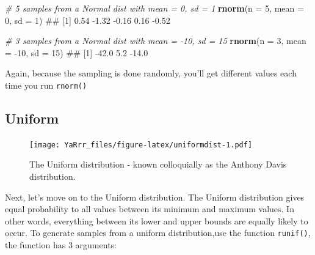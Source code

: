 \documentclass[]{book}
\newenvironment{Shaded}{\begin{snugshade}}{\end{snugshade}}
\newcommand{\KeywordTok}[1]{\textcolor[rgb]{0.13,0.29,0.53}{\textbf{{#1}}}}
\newcommand{\DataTypeTok}[1]{\textcolor[rgb]{0.13,0.29,0.53}{{#1}}}
\newcommand{\DecValTok}[1]{\textcolor[rgb]{0.00,0.00,0.81}{{#1}}}
\newcommand{\CommentTok}[1]{\textcolor[rgb]{0.56,0.35,0.01}{\textit{{#1}}}}
\newcommand{\NormalTok}[1]{{#1}}
\theoremstyle{definition}
\theoremstyle{definition}
\theoremstyle{remark}
\begin{document}
\begin{Shaded}
\begin{Highlighting}[]
\CommentTok{# 5 samples from a Normal dist with mean = 0, sd = 1}
\KeywordTok{rnorm}\NormalTok{(}\DataTypeTok{n =} \DecValTok{5}\NormalTok{, }\DataTypeTok{mean =} \DecValTok{0}\NormalTok{, }\DataTypeTok{sd =} \DecValTok{1}\NormalTok{)}
\NormalTok{## [1]  0.54 -1.32 -0.16  0.16 -0.52}

\CommentTok{# 3 samples from a Normal dist with mean = -10, sd = 15}
\KeywordTok{rnorm}\NormalTok{(}\DataTypeTok{n =} \DecValTok{3}\NormalTok{, }\DataTypeTok{mean =} \NormalTok{-}\DecValTok{10}\NormalTok{, }\DataTypeTok{sd =} \DecValTok{15}\NormalTok{)}
\NormalTok{## [1] -42.0   5.2 -14.0}
\end{Highlighting}
\end{Shaded}

Again, because the sampling is done randomly, you'll get different
values each time you run \texttt{rnorm()}

\subsection{Uniform}\label{uniform}

\begin{figure}[htbp]
\centering
\texttt{[image: YaRrr\_files/figure-latex/uniformdist-1.pdf]}
\caption{\label{fig:uniformdist}The Uniform distribution - known
colloquially as the Anthony Davis distribution.}
\end{figure}

Next, let's move on to the Uniform distribution. The Uniform
distribution gives equal probability to all values between its minimum
and maximum values. In other words, everything between its lower and
upper bounds are equally likely to occur. To generate samples from a
uniform distribution,use the function \texttt{runif()}, the function has
3 arguments:
\end{document}
